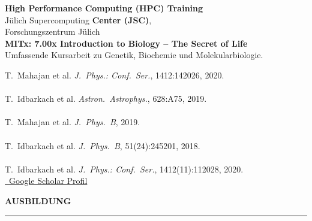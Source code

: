 \documentclass{thejus_cv}
\begin{document}
\begin{paracol}{2}
\vspace{-0.5em}

\textbf{High Performance Computing (HPC) Training}\\
J\"ulich Supercomputing \textbf{Center (JSC)},\\
Forschungszentrum J\"ulich\\[0.3cm]

\textbf{MITx: 7.00x Introduction to Biology -- The Secret of Life}\\
{\small Umfassende Kursarbeit zu Genetik, Biochemie und Molekularbiologie.}\\[0.4cm]

\vspace{-0.5em}

{\small
T.~Mahajan et al. \textit{J.~Phys.: Conf.~Ser.}, 1412:142026, 2020.\\[0.15cm]
{\color{cvlightgray}\hdashrule{\linewidth}{0.5pt}{1mm}}\\[0.15cm]
T.~Idbarkach et al. \textit{Astron.~Astrophys.}, 628:A75, 2019.\\[0.15cm]
{\color{cvlightgray}\hdashrule{\linewidth}{0.5pt}{1mm}}\\[0.15cm]
T.~Mahajan et al. \textit{J.~Phys.~B}, 2019.\\[0.15cm]
{\color{cvlightgray}\hdashrule{\linewidth}{0.5pt}{1mm}}\\[0.15cm]
T.~Idbarkach et al. \textit{J.~Phys.~B}, 51(24):245201, 2018.\\[0.15cm]
{\color{cvlightgray}\hdashrule{\linewidth}{0.5pt}{1mm}}\\[0.15cm]
T.~Idbarkach et al. \textit{J.~Phys.: Conf.~Ser.}, 1412(11):112028, 2020.
}\\[0.1cm]
\href{https://scholar.google.com/citations?user=PJkZwAwAAAAJ}{\faGraduationCap\ Google Scholar Profil}



\vspace{-1.5em}
\end{paracol}

\begin{center}
    \vspace{0.1em}
    {\Large\textbf{AUSBILDUNG}}\\
    {\color{cvtext}\rule{0.5\linewidth}{1.5pt}}\par
    \vspace{0.3em}
\end{center}
\end{document}
